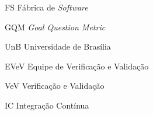 \begin{siglas}
  \item[FS] Fábrica de \textit{Software}
  \item[GQM] \textit{Goal Question Metric}
  \item[UnB] Universidade de Brasília
  \item[EVeV] Equipe de Verificação e Validação
  \item[VeV] Verificação e Validação
  \item[IC] Integração Contínua
\end{siglas}
